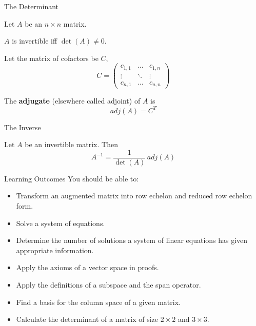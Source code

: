 \documentclass[11pt, xcolor={dvipsnames}, hyperref={colorlinks, allcolors=Blue}]{beamer}
\newcommand\bc[1]{{\usebeamercolor[fg]{frametitle} {\textbf{#1}}}} %
\begin{document}
\begin{frame}{The Determinant}

Let $A$ be an $n \times n$ matrix. 

\begin{theorem}
$A$ is invertible iff $\det(A) \not = 0$.
\end{theorem}
\bigskip

Let the matrix of cofactors be $C$,
\[C =
 \begin{pmatrix}
 c_{1,1} & \dots & c_{1,n}\\ 
\vdots & \ddots & \vdots\\
c_{n,1} & \dots & c_{n,n}
\end{pmatrix}
\]

The \bc{adjugate} (elsewhere called adjoint) of $A$ is 
\[adj(A) = C^{T}\]
\end{frame}


\begin{frame}{The Inverse}
\begin{theorem}
Let $A$ be an invertible matrix. Then
\[A^{-1} = \frac{1}{\det(A)}\, adj(A)\]
\end{theorem}
\end{frame}

\begin{frame}{Learning Outcomes}
You should be able to:
\begin{itemize}
	\item Transform an augmented matrix into row echelon and reduced row echelon form.
	\item Solve a system of equations.
	\item Determine the number of solutions a system of linear equations has given appropriate information.
	\item Apply the axioms of a vector space in proofs.
	\item Apply the definitions of a subspace and the span operator.
	\item Find a basis for the column space of a given matrix.
	\item Calculate the determinant of a matrix of size $2\times2$ and $3\times3$.
\end{itemize}
\end{frame}
\end{document}
